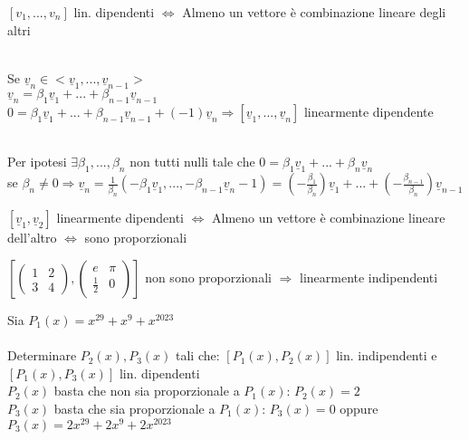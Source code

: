   \begin{teorema}\label{caratterizzazione}
    $[v_1,...,v_n]$ lin. dipendenti $\Longleftrightarrow $ Almeno un
    vettore è combinazione lineare degli altri\\
    \begin{dimostrazione}
      \phantom{}\\
      Se $\underline{v}_n\in <\underline{v}_1,...,\underline{v}_{n-1}>$\\
      $\underline{v}_n=\beta_1 \underline{v}_1+...+\beta_{n-1}
      \underline{v}_{n-1}$\\
      $0=\beta_1
      \underline{v}_1+...+\beta_{n-1}\underline{v}_{n-1}+(-1)\underline{v}_n
      \Longrightarrow [\underline{v}_1,...,\underline{v}_n]$
      linearmente dipendente
    \end{dimostrazione}
    \begin{dimostrazione}
      \phantom{}\\
      Per ipotesi $\exists\beta_1,...,\beta_n$ non tutti nulli tale
      che $0=\beta_1 \underline{v}_1+...+\beta_n \underline{v}_n$\\
      se $\beta_n\neq 0\Longrightarrow
      \underline{v}_n=\frac{1}{\beta_n}(-\beta_1
      \underline{v}_1,...,-\beta_{n-1}\underline{v}_n-1)=(-\frac{\beta_1}{\beta_n})\underline{v}_1+...+(-\frac{\beta_{n-1}}{\beta_n})\underline{v}_{n-1}$
    \end{dimostrazione}
  \end{teorema}

  \begin{corollario}
    $[\underline{v}_1,\underline{v}_2]$ linearmente dipendenti
    $\Longleftrightarrow$ Almeno un vettore è combinazione lineare
    dell'altro $\Longleftrightarrow $ sono proporzionali
  \end{corollario}

  \begin{es}
    $[
      \begin{pmatrix}
        1 & 2\\
        3 & 4
      \end{pmatrix},
      \begin{pmatrix}
        e           & \pi\\
        \frac{1}{2} & 0
      \end{pmatrix}
    ]$ non sono proporzionali $\Longrightarrow$ linearmente indipendenti
  \end{es}

  \begin{esercizio}
    Sia $P_1(x)=x^{29}+x^9+x^2023$\\\\
    Determinare $P_2(x),P_3(x)$ tali che: $[P_1(x),P_2(x)]$ lin.
    indipendenti e $[P_1(x),P_3(x)]$ lin. dipendenti\\
    $P_2(x)$ basta che non sia proporzionale a $P_1(x)$: $P_2(x)=2$\\
    $P_3(x)$ basta che sia proporzionale a $P_1(x)$: $P_3(x)=0$
    oppure $P_3(x)=2x^{29}+2x^9+2x^2023$
  \end{esercizio}

